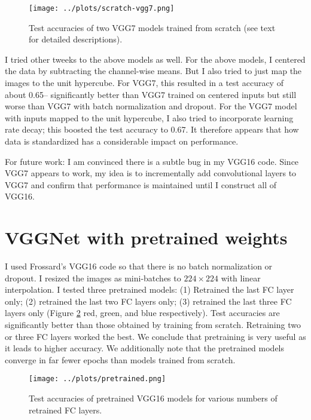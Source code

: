 \documentclass[11pt]{article}
\begin{document}
\begin{figure}
\centering
\texttt{[image: ../plots/scratch-vgg7.png]}
\caption{\label{fig-scratch-vgg7} Test accuracies of two VGG7 models trained from scratch (see text for detailed descriptions).}
\end{figure}

I tried other tweeks to the above models as well. For the above models, I centered the data by subtracting the channel-wise means. But I also tried to just map the images to the unit hypercube. For VGG7, this resulted in a test accuracy of about 0.65-- significantly better than VGG7 trained on centered inputs but still worse than VGG7 with batch normalization and dropout. For the VGG7 model with inputs mapped to the unit hypercube, I also tried to incorporate learning rate decay; this boosted the test accuracy to 0.67. It therefore appears that how data is standardized has a considerable impact on performance.

For future work: I am convinced there is a subtle bug in my VGG16 code. Since VGG7 appears to work, my idea is to incrementally add convolutional layers to VGG7 and confirm that performance is maintained until I construct all of VGG16.


\section{VGGNet with pretrained weights}

I used Frossard's VGG16 code so that there is no batch normalization or dropout. I resized the images as mini-batches to $224\times 224$ with linear interpolation. I tested three pretrained models: (1) Retrained the last FC layer only; (2) retrained the last two FC layers only; (3) retrained the last three FC layers only (Figure \ref{fig-pretrained} red, green, and blue respectively). Test accuracies are significantly better than those obtained by training from scratch. Retraining two or three FC layers worked the best. We conclude that pretraining is very useful as it leads to higher accuracy. We additionally note that the pretrained models converge in far fewer epochs than models trained from scratch.

\begin{figure}
\centering
\texttt{[image: ../plots/pretrained.png]}
\caption{\label{fig-pretrained} Test accuracies of pretrained VGG16 models for various numbers of retrained FC layers.}
\end{figure}
\end{document}
